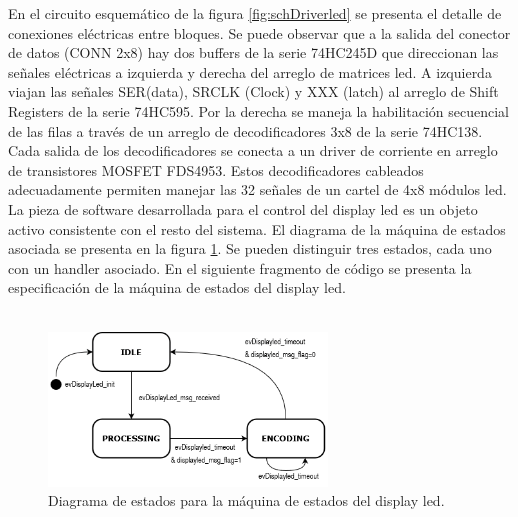 En el circuito esquemático de la figura \ref{fig:schDriverled} se presenta el detalle de conexiones eléctricas entre bloques. Se puede observar que a la salida del conector de datos (CONN 2x8) hay dos buffers de la serie 74HC245D que direccionan las señales eléctricas a izquierda y derecha del arreglo de matrices led. A izquierda viajan las señales SER(data), SRCLK (Clock) y XXX (latch) al arreglo de Shift Registers de la serie 74HC595. Por la derecha se maneja la habilitación secuencial de las filas a través de un arreglo de decodificadores 3x8 de la serie 74HC138. Cada salida de los decodificadores se conecta a un driver de corriente en arreglo de transistores MOSFET FDS4953. Estos decodificadores cableados adecuadamente permiten manejar las 32 señales de un cartel de 4x8 módulos led. \\
%
%

La pieza de software desarrollada para el control del display led es un objeto activo consistente con el resto del sistema. El diagrama de la máquina de estados asociada se presenta en la figura \ref{fig:fsmDisplayled}. Se pueden distinguir tres estados, cada uno con un handler asociado. En el siguiente fragmento de código se presenta la especificación de la máquina de estados del display led. \\\\

\begin{figure}[htbp]
	\centering
	\includegraphics[width=0.66\textwidth]{./Figures/FSMdisplayled.png}
	\caption{Diagrama de estados para la máquina de estados del display led.}
	\label{fig:fsmDisplayled}
\end{figure}




